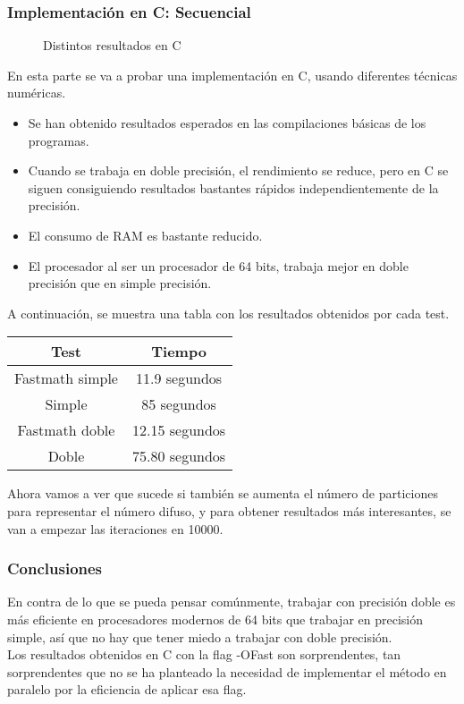 \subsubsection{Implementación en C: Secuencial}
\begin{figure}[H]
	\centering
	\caption{Distintos resultados en C}
	\label{fig:eulercseq}
\end{figure}
En esta parte se va a probar una implementación en C, usando diferentes técnicas numéricas.
\begin{itemize}
	\item Se han obtenido resultados esperados en las compilaciones básicas de los programas.
	\item Cuando se trabaja en doble precisión, el rendimiento se reduce, pero en C se siguen consiguiendo resultados bastantes rápidos independientemente de la precisión.
	\item El consumo de RAM es bastante reducido.
	\item El procesador al ser un procesador de 64 bits, trabaja mejor en doble precisión que en simple precisión.
\end{itemize}

A continuación, se muestra una tabla con los resultados obtenidos por cada test.

\begin{table}[H]
	\centering
	\begin{tabular}{|c|c|}
		\hline
		\textbf{Test}  & \textbf{Tiempo}        \\ \hline
		Fastmath simple & 11.9 segundos \\ 
		Simple     & 85 segundos    \\
		Fastmath doble   & 12.15 segundos    \\
		Doble   & 75.80 segundos \\ \hline
	\end{tabular}%
\end{table}

Ahora vamos a ver que sucede si también se aumenta el número de particiones para representar el número difuso, y para obtener resultados más interesantes, se van a empezar las iteraciones en 10000.

\subsubsection{Conclusiones}
En contra de lo que se pueda pensar comúnmente, trabajar con precisión doble es más eficiente en procesadores modernos de 64 bits que trabajar en precisión simple, así que no hay que tener miedo a trabajar con doble precisión. \\
Los resultados obtenidos en C con la flag -OFast son sorprendentes, tan sorprendentes que no se ha planteado la necesidad  de implementar el método en paralelo por la eficiencia de aplicar esa flag.
